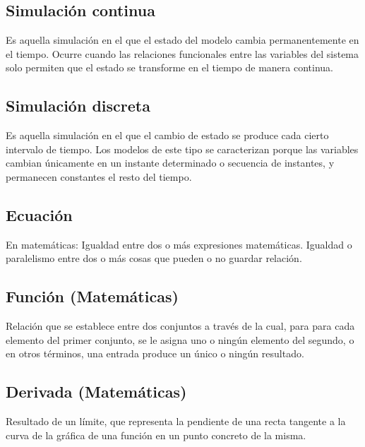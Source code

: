 \subsection{Simulación continua}
Es aquella simulación en el que el estado del modelo cambia permanentemente en el tiempo. Ocurre cuando las relaciones funcionales entre las variables del sistema solo permiten que el estado se transforme en el tiempo de manera continua.


\subsection{Simulación discreta}
Es aquella simulación en el que el cambio de estado se produce cada cierto intervalo de tiempo. Los modelos de este tipo se caracterizan porque las variables cambian únicamente en un instante determinado o secuencia de instantes, y permanecen constantes el resto del tiempo.


\subsection{Ecuación}
En matemáticas: Igualdad entre dos o más expresiones matemáticas.
Igualdad o paralelismo entre dos o más cosas que pueden o no guardar relación.


\subsection{Función (Matemáticas)}
Relación que se establece entre dos conjuntos a través de la cual, para para cada elemento del primer conjunto, se le asigna uno o ningún elemento del segundo, o en otros términos, una entrada produce un único o ningún resultado.


\subsection{Derivada (Matemáticas)}
Resultado de un límite, que representa la pendiente de una recta tangente a la curva de la gráfica de una función en un punto concreto de la misma.

